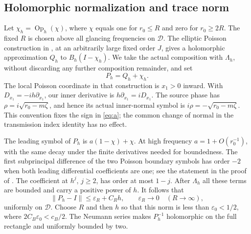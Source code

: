 \documentclass[11pt,a4paper]{article}
\DeclareMathOperator{\Op}{Op}
\theoremstyle{remark}
\numberwithin{equation}{section}
\begin{document}
\subsection{Holomorphic normalization and trace norm}
Let $\chi_h=\Op_h(\chi)$, where $\chi$ equals one for $r_0\le R$
and zero for $r_0\ge2R$. The fixed $R$ is chosen above all glancing
frequencies on $\mathcal D$. The elliptic Poisson construction in
\cite[Section~2, (2.7), (2.9), (2.13)]{PV}, at an arbitrarily large
fixed order $J$, gives a holomorphic approximation $Q_h$ to
$B_h(I-\chi_h)$. We take the actual composition with $\Lambda_h$,
without discarding any further composition remainder, and set
\begin{equation}\label{eq:P}
 P_h=Q_h+\chi_h.
\end{equation}
The local Poisson coordinate in that construction is $x_1>0$ inward.
With $D_{x_1}=-ih\partial_{x_1}$, our inner derivative is
$h\partial_{x_1}=iD_{x_1}$. The source phase has
$\rho=i\sqrt{r_0-m\zeta}$, and hence its actual inner-normal symbol
is $i\rho=-\sqrt{r_0-m\zeta}$. This convention fixes the sign in
\eqref{eq:a}; the common change of normal in the transmission index
identity has no effect.

The leading symbol of $P_h$ is $a(1-\chi)+\chi$. At high frequency
$a=1+O(r_0^{-1})$, with the same decay under the finite derivatives
needed for boundedness. The first subprincipal difference of the two
Poisson boundary symbols has order $-2$ when both leading differential
coefficients are one; see the statement in the proof of
\cite[Lemma~3.3, p.~18, using (2.8)]{PV}. The coefficient at $h^j$, $j\ge2$, has order at
most $1-j$. After $\Lambda_h$ all these terms are bounded and carry
a positive power of $h$. It follows that
\begin{equation}\label{eq:P-close}
 \|P_h-I\|\le\varepsilon_R+C_Rh,\qquad\varepsilon_R\longrightarrow0
 \quad(R\longrightarrow\infty),
\end{equation}
uniformly on $\mathcal D$. Choose $R$ and then $h$ so that this norm
is less than $\varepsilon_0<1/2$, where
$2C_B\varepsilon_0<c_B/2$. The Neumann series makes $P_h^{-1}$
holomorphic on the full rectangle and uniformly bounded by two.
\end{document}
